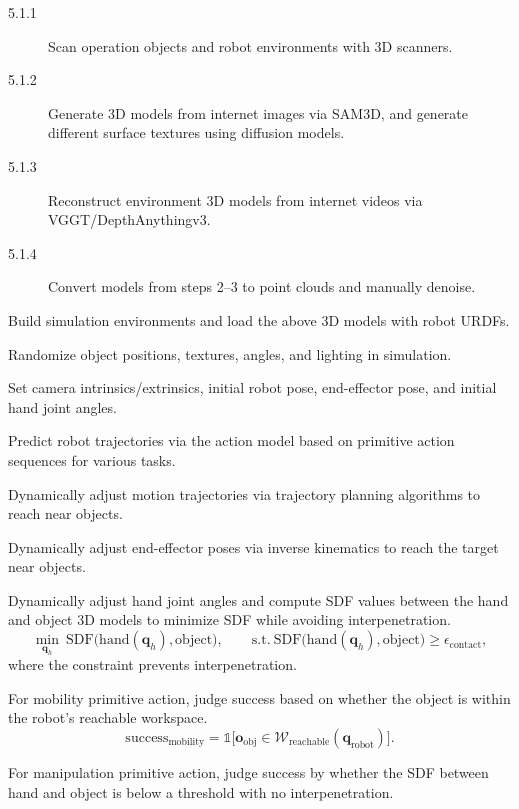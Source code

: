 \documentclass[12pt,a4paper]{article}
\begin{document}
\begin{description}
\begin{description}
\begin{description}
\item[5.1.1] Scan operation objects and robot environments with 3D scanners.
\item[5.1.2] Generate 3D models from internet images via SAM3D, and generate different surface textures using diffusion models.
\item[5.1.3] Reconstruct environment 3D models from internet videos via VGGT/\allowbreak{}Depth\-Anything\-v3.
\item[5.1.4] Convert models from steps 2--3 to point clouds and manually denoise.
\end{description}
\item[5.2] Build simulation environments and load the above 3D models with robot URDFs.
\item[5.3] Randomize object positions, textures, angles, and lighting in simulation.
\item[5.4] Set camera intrinsics/extrinsics, initial robot pose, end-effector pose, and initial hand joint angles.
\item[5.5] Predict robot trajectories via the action model based on primitive action sequences for various tasks.
\item[5.6] Dynamically adjust motion trajectories via trajectory planning algorithms to reach near objects.
\item[5.7] Dynamically adjust end-effector poses via inverse kinematics to reach the target near objects.
\item[5.8] Dynamically adjust hand joint angles and compute SDF values between the hand and object 3D models to minimize SDF while avoiding interpenetration.
\begin{equation}
\min_{\mathbf{q}_h}\ \mathrm{SDF}\bigl(\mathrm{hand}(\mathbf{q}_h),\mathrm{object}\bigr),\qquad
\mathrm{s.t.}\ \mathrm{SDF}\bigl(\mathrm{hand}(\mathbf{q}_h),\mathrm{object}\bigr)\ge\epsilon_{\mathrm{contact}},
\label{eq:sdf-manip}
\end{equation}
where the constraint prevents interpenetration.
\item[5.9] For mobility primitive action, judge success based on whether the object is within the robot's reachable workspace.
\begin{equation}
\mathrm{success}_{\mathrm{mobility}}=\mathbb{1}\bigl[\mathbf{o}_{\mathrm{obj}}\in\mathcal{W}_{\mathrm{reachable}}(\mathbf{q}_{\mathrm{robot}})\bigr].
\label{eq:success-mobility}
\end{equation}
\item[5.10] For manipulation primitive action, judge success by whether the SDF between hand and object is below a threshold with no interpenetration.

\end{description}
\end{description}
\end{document}
